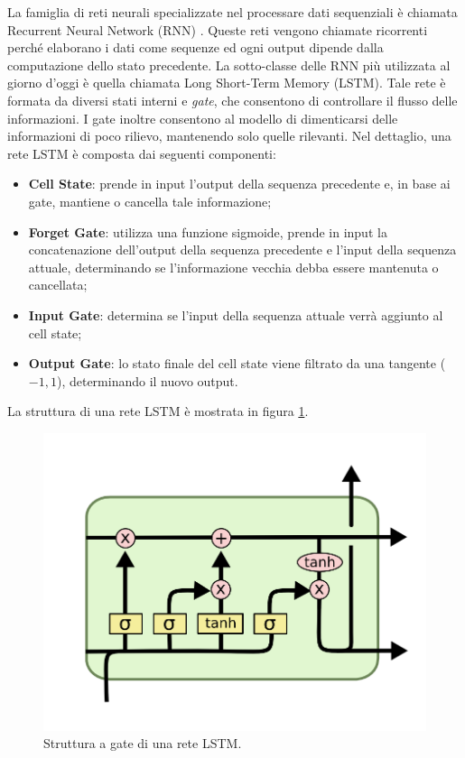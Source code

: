 \documentclass[11pt]{report}
\begin{document}
La famiglia di reti neurali specializzate nel processare dati sequenziali è chiamata Recurrent Neural Network (RNN) \cite{rumelhart1985learning}. Queste reti vengono chiamate ricorrenti perché elaborano i dati come sequenze ed ogni output dipende dalla computazione dello stato precedente. La sotto-classe delle RNN più utilizzata al giorno d'oggi è quella chiamata Long Short-Term Memory (LSTM)\cite{hochreiter1997long}. Tale rete è formata da diversi stati interni e \textit{gate}, che consentono di controllare il flusso delle informazioni. I gate inoltre consentono al modello di dimenticarsi delle informazioni di poco rilievo, mantenendo solo quelle rilevanti. Nel dettaglio, una rete LSTM è composta dai seguenti componenti:
\begin{itemize}
    \item \textbf{Cell State}: prende in input l'output della sequenza precedente e, in base ai gate, mantiene o cancella tale informazione;
    
    \item \textbf{Forget Gate}: utilizza una funzione sigmoide, prende in input la concatenazione dell'output della sequenza precedente e l'input della sequenza attuale, determinando se l'informazione vecchia debba essere mantenuta o cancellata;
    
    \item \textbf{Input Gate}: determina se l'input della sequenza attuale verrà aggiunto al cell state;
    
    \item \textbf{Output Gate}: lo stato finale del cell state viene filtrato da una tangente ($-1,1$), determinando il nuovo output.
    
\end{itemize}
La struttura di una rete LSTM è mostrata in figura \ref{fig:lstm}.


\begin{figure}[h]
    \centering
    \includegraphics[scale = 0.7]{img/lstm.png}
    \caption[Struttura a gate di una rete LSTM.]{Struttura a gate di una rete LSTM.\footnotemark}
    \label{fig:lstm}
\end{figure}
\end{document}
